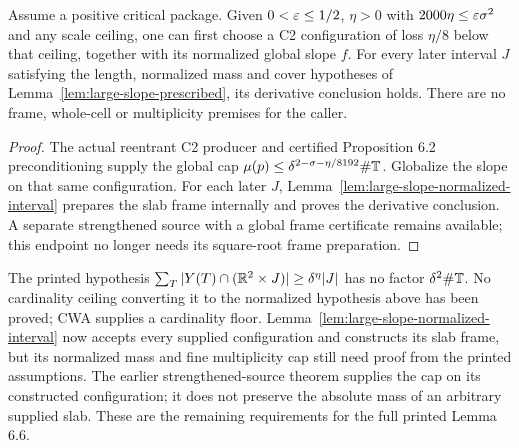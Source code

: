 \begin{proposition}
\label{prop:c2-prescribed-intervals}
\leanok
{}
Assume a positive critical package. Given $0<\varepsilon\leq1/2$, $\eta>0$
with $2000\eta\leq\varepsilon\sigma^2$ and any scale ceiling, one can first
choose a C2 configuration of loss $\eta/8$ below that ceiling, together
with its normalized global slope $f$. For every later interval $J$
satisfying the length, normalized mass and cover hypotheses of
Lemma~\ref{lem:large-slope-prescribed}, its derivative conclusion holds.
There are no frame, whole-cell or multiplicity premises for the caller.
\end{proposition}
\begin{proof}
\leanok
The actual reentrant C2 producer and certified Proposition 6.2
preconditioning supply the global cap
$\mu(p)\leq\delta^{2-\sigma-\eta/8192}\#\mathbb{T}$.
Globalize the slope on that same configuration. For each later $J$,
Lemma~\ref{lem:large-slope-normalized-interval} prepares the slab frame
internally and proves the derivative conclusion. A separate strengthened
source with a global frame certificate remains available; this endpoint
no longer needs its square-root frame preparation.
\end{proof}
\begin{remark}
\label{rem:lemma66-mass-normalization}
The printed hypothesis $\sum_T|Y(T)\cap(\mathbb{R}^2\times J)|\geq\delta^\eta|J|$
has no factor $\delta^2\#\mathbb{T}$. No cardinality ceiling converting it to
the normalized hypothesis above has been proved; CWA supplies a
cardinality floor. Lemma~\ref{lem:large-slope-normalized-interval} now
accepts every supplied configuration and constructs its slab frame,
but its normalized mass and fine multiplicity cap still need proof
from the printed assumptions. The earlier strengthened-source theorem
supplies the cap on its constructed configuration; it does not preserve
the absolute mass of an arbitrary supplied slab. These are the remaining
requirements for the full printed Lemma 6.6.
\end{remark}

